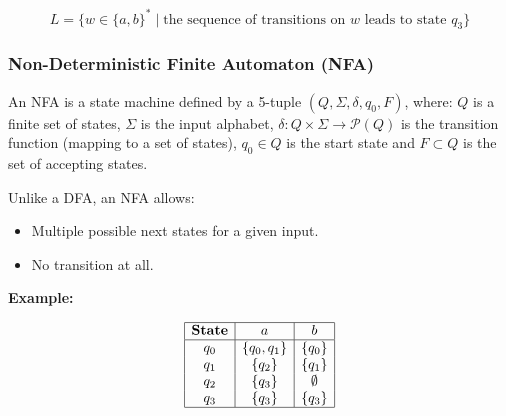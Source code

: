 \[
    L = \{ w \in \{a,b\}^* \mid \text{the sequence of transitions on } w \text{ leads to state } q_3 \}
\]

\subsubsection{Non-Deterministic Finite Automaton (NFA)}  

An NFA is a state machine defined by a 5-tuple \((Q, \Sigma, \delta, q_0, F)\), where: 
\(Q\) is a finite set of states, \(\Sigma\) is the input alphabet, 
\(\delta: Q \times \Sigma \to \mathcal{P}(Q)\) is the transition function (mapping to a set of states),
\(q_0 \in Q\) is the start state and \(F \subset Q\) is the set of accepting states.

Unlike a DFA, an NFA allows:
\begin{itemize}
    
    \item Multiple possible next states for a given input.
    
    \item No transition at all.

\end{itemize}

\textbf{Example:}

\[
    \begin{array}{|c|c|c|}
    \hline
    \textbf{State} & a & b \\
    \hline
    q_0 & \{q_0, q_1\} & \{q_0\} \\
    q_1 & \{q_2\} & \{q_1\} \\
    q_2 & \{q_3\} & \emptyset \\
    q_3 & \{q_3\} & \{q_3\} \\
    \hline
    \end{array}
\]

\begin{center}
\end{center}

